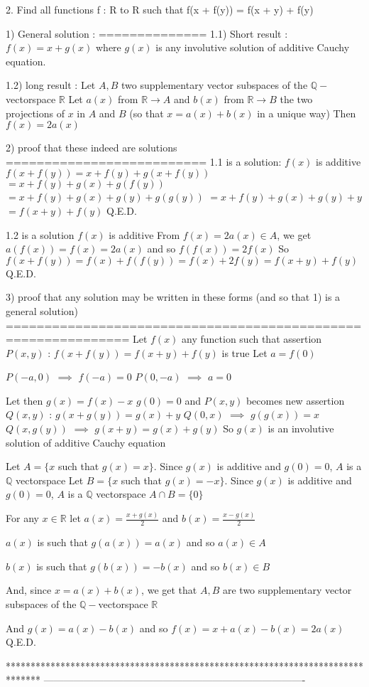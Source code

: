\begin{solution}
	\begin{tcolorbox}2. Find all functions f : R to R such that
f(x + f(y)) = f(x + y) + f(y)\end{tcolorbox}
1) General solution :
==============
1.1) Short result : $f(x)=x+g(x)$ where $g(x)$ is any involutive solution of additive Cauchy equation.

1.2) long result :
Let $A,B$ two supplementary vector subspaces of the $\mathbb Q-$vectorspace $\mathbb R$
Let $a(x)$ from $\mathbb R\to A$ and $b(x)$ from $\mathbb R\to B$ the two projections of $x$ in $A$ and $B$ (so that $x=a(x)+b(x)$ in a unique way)
Then $f(x)=2a(x)$

2) proof that these indeed are solutions
==========================
1.1 is a solution:
$f(x)$ is additive
$f(x+f(y))=x+f(y)+g(x+f(y))$ $=x+f(y)+g(x)+g(f(y))$ $=x+f(y)+g(x)+g(y)+g(g(y))$ $=x+f(y)+g(x)+g(y)+y$ $=f(x+y)+f(y)$
Q.E.D.

1.2 is a solution
$f(x)$ is additive
From $f(x)=2a(x)\in A$, we get $a(f(x))=f(x)=2a(x)$ and so $f(f(x))=2f(x)$
So $f(x+f(y))=f(x)+f(f(y))=f(x)+2f(y)=f(x+y)+f(y)$
Q.E.D.

3) proof that any solution may be written in these forms (and so that 1) is a general solution)
==============================================================
Let $f(x)$ any function such that assertion $P(x,y)$ : $f(x+f(y))=f(x+y)+f(y)$ is true
Let $a=f(0)$

$P(-a,0)$ $\implies$ $f(-a)=0$
$P(0,-a)$ $\implies$ $a=0$

Let then $g(x)=f(x)-x$
$g(0)=0$ and $P(x,y)$ becomes new assertion $Q(x,y)$ : $g(x+g(y))=g(x)+y$
$Q(0,x)$ $\implies$ $g(g(x))=x$
$Q(x,g(y))$ $\implies$ $g(x+y)=g(x)+g(y)$
So $g(x)$ is an involutive solution of additive Cauchy equation

Let $A=\{x$ such that $g(x)=x\}$. Since $g(x)$ is additive and $g(0)=0$, $A$ is a $\mathbb Q$ vectorspace
Let $B=\{x$ such that $g(x)=-x\}$. Since $g(x)$ is additive and $g(0)=0$, $A$ is a $\mathbb Q$ vectorspace
$A\cap B=\{0\}$

For any $x\in\mathbb R$ let $a(x)=\frac{x+g(x)}2$ and $b(x)=\frac{x-g(x)}2$

$a(x)$ is such that $g(a(x))=a(x)$ and so $a(x)\in A$

$b(x)$ is such that $g(b(x))=-b(x)$ and so $b(x)\in B$

And, since $x=a(x)+b(x)$, we get that $A,B$ are two supplementary vector subspaces of the $\mathbb Q-$vectorspace $\mathbb R$

And $g(x)=a(x)-b(x)$ and so $f(x)=x+a(x)-b(x)=2a(x)$
Q.E.D.
\end{solution}
*******************************************************************************
-------------------------------------------------------------------------------

